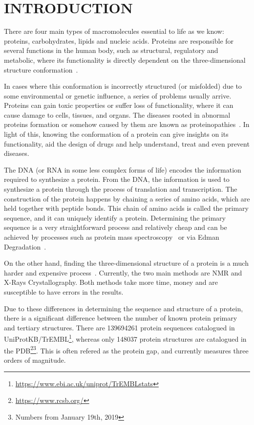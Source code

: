 \chapter{INTRODUCTION}\label{chap:introduction}

There are four main types of macromolecules essential to life as we know: proteins,
carbohydrates, lipids and nucleic acids. Proteins are responsible for several
functions in the human body, such as structural, regulatory and metabolic,
where its functionality is directly dependent on the three-dimensional
structure conformation~\cite{kihara2014protein}.

In cases where this conformation is incorrectly structured (or misfolded) due to
some environmental or genetic influence, a series of problems usually arrive.
Proteins can gain toxic properties or suffer loss of functionality,
where it can cause damage to cells,
tissues, and organs. The diseases rooted in abnormal proteins formation or somehow
caused by them are known as proteinopathies~\cite{shrestha2015yeast}.
In light of this, knowing the conformation of a protein can give insights on its
functionality, aid the design of drugs and help understand, treat and even prevent diseases.

The \ac{DNA} (or \ac{RNA} in some less complex forms of life) encodes the information
required to synthesize a protein. From the \ac{DNA}, the information is used to
synthesize a protein through the process of translation and transcription. The
construction of the protein happens by chaining a series of amino acids, which are
held together with peptide bonds. This chain of amino acids is called the primary
sequence, and it can uniquely identify a protein. Determining the primary
sequence is a very straightforward process and relatively cheap and can be
achieved by processes such as protein mass
spectroscopy~\cite{domon2006mass,covey1999protein}
or via Edman Degradation~\cite{edman1967protein}.

On the other hand, finding the three-dimensional structure of a protein is a
much harder and expensive process~\cite{guntert2004automated}.
Currently, the two main methods are
\ac{NMR} and X-Rays Crystallography. Both methods take more
time, money and are susceptible to have errors in the results.

Due to these differences in determining the sequence and structure of a
protein, there is a significant difference between the number of known protein
primary and tertiary structures. There are \num{139694261} protein sequences 
catalogued in UniProtKB/TrEMBL\footnote{\url{https://www.ebi.ac.uk/uniprot/TrEMBLstats}},
whereas only \num{148037} protein structures are catalogued in
the \ac{PDB}\footnote{\url{https://www.rcsb.org/}}\footnote{Numbers from January 19th, 2019}.
This is often refered as the protein gap, and currently measures three orders of magnitude.


